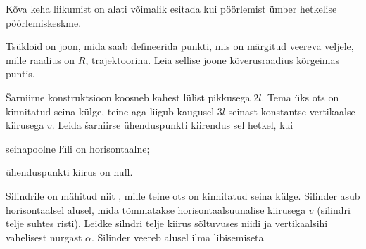 \documentclass[a4paper,11pt,twocolumn]{article}
\begin{document}
Kõva keha liikumist on alati võimalik esitada kui pöörlemist ümber hetkelise pöörlemiskeskme.
\begin{question}
	Tsükloid on joon, mida saab defineerida punkti, mis on märgitud veereva veljele, mille raadius on $ R $, trajektoorina. Leia sellise joone kõverusraadius kõrgeimas puntis.
\end{question}
\begin{question}[kin7][5cm]
	Šarniirne konstruktsioon koosneb kahest lülist pikkusega $ 2l $. Tema üks ots on kinnitatud seina külge, teine aga liigub kaugusel $ 3l $ seinast konstantse vertikaalse kiirusega $ v $. Leida šarniirse ühenduspunkti kiirendus sel hetkel, kui
	\begin{subquestion}
		\item seinapoolne lüli on horisontaalne;
		\item ühenduspunkti kiirus on null.
	\end{subquestion}
\end{question}
\vspace{1em}
\begin{question}[kin8][6cm]
	Silindrile on mähitud niit , mille teine ots on kinnitatud seina külge. Silinder asub horisontaalsel alusel, mida tõmmatakse horisontaalsuunalise kiirusega $ v $ (silindri telje suhtes risti). Leidke silndri telje kiirus sõltuvuses niidi ja vertikaalsihi vahelisest nurgast $ \alpha $. Silinder veereb alusel ilma libisemiseta
\end{question}
\end{document}
